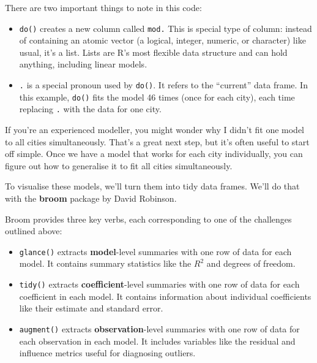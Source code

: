 There are two important things to note in this code:

\begin{itemize}
\item
  \texttt{do()} creates a new column called \texttt{mod.} This is
  special type of column: instead of containing an atomic vector (a
  logical, integer, numeric, or character) like usual, it's a list.
  Lists are R's most flexible data structure and can hold anything,
  including linear models.
\item
  \texttt{.} is a special pronoun used by \texttt{do()}. It refers to
  the ``current'' data frame. In this example, \texttt{do()} fits the
  model 46 times (once for each city), each time replacing \texttt{.}
  with the data for one city. 
\end{itemize}

If you're an experienced modeller, you might wonder why I didn't fit one
model to all cities simultaneously. That's a great next step, but it's
often useful to start off simple. Once we have a model that works for
each city individually, you can figure out how to generalise it to fit
all cities simultaneously.

To visualise these models, we'll turn them into tidy data frames. We'll
do that with the \textbf{broom} package by David Robinson. 
 

\begin{Shaded}
\begin{Highlighting}[]
\end{Highlighting}
\end{Shaded}

Broom provides three key verbs, each corresponding to one of the
challenges outlined above:

\begin{itemize}
\item
  \texttt{glance()} extracts \textbf{model}-level summaries with one row
  of data for each model. It contains summary statistics like the
  \(R^2\) and degrees of freedom.
\item
  \texttt{tidy()} extracts \textbf{coefficient}-level summaries with one
  row of data for each coefficient in each model. It contains
  information about individual coefficients like their estimate and
  standard error.
\item
  \texttt{augment()} extracts \textbf{observation}-level summaries with
  one row of data for each observation in each model. It includes
  variables like the residual and influence metrics useful for
  diagnosing outliers.
\end{itemize}

